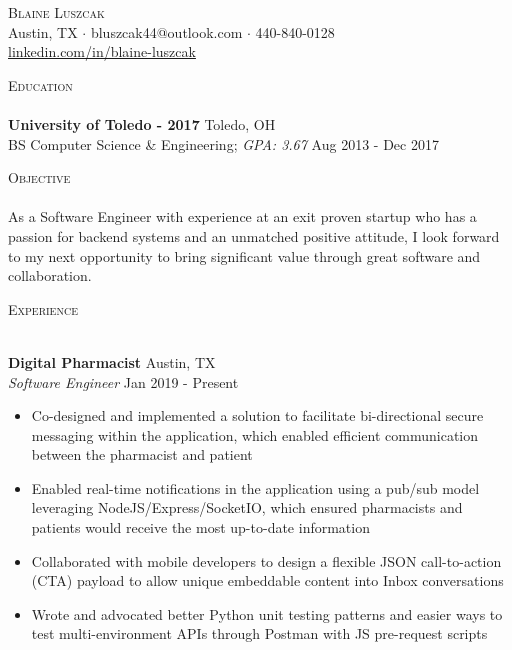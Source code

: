 \documentclass[a4paper]{article}
\newcommand{\lineunder} {
    \vspace*{-8pt} \\
    \hspace*{-18pt} \hrulefill \\
}
\newcommand{\header} [1] {
    {\hspace*{-18pt}\vspace*{6pt} \textsc{#1}}
    \vspace*{-6pt} \lineunder
}
\begin{document}
\vspace*{-40pt}

\vspace*{-10pt}
\begin{center}
    {\Huge \scshape {Blaine Luszcak}}\\
    Austin, TX $\cdot$ bluszcak44@outlook.com $\cdot$ 440-840-0128 \\
    \url{linkedin.com/in/blaine-luszcak}
\end{center}

\header{Education}
\textbf{University of Toledo - 2017} \hfill Toledo, OH \\
BS Computer Science \& Engineering; \textit{GPA: 3.67} \hfill Aug 2013 - Dec 2017 \\
\vspace{2mm}

\header{Objective}
As a Software Engineer with experience at an exit proven startup who has a passion for backend systems and an
unmatched positive attitude, I look forward to my next opportunity to bring significant value through great software and
collaboration.

\vspace{2mm}

\header{Experience}
\vspace{1mm}

\textbf{Digital Pharmacist} \hfill Austin, TX \\
\textit{Software Engineer} \hfill Jan 2019 - Present \\
\vspace{-3mm}
\begin{itemize} \itemsep -0.25mm
    \item Co-designed and implemented a solution to facilitate bi-directional secure messaging within the application,
    which enabled efficient communication between the pharmacist and patient
    \item Enabled real-time notifications in the application using a pub/sub model leveraging NodeJS/Express/SocketIO,
        which ensured pharmacists and patients would receive the most up-to-date information
    \item Collaborated with mobile developers to design a flexible JSON call-to-action (CTA) payload to allow unique
    embeddable content into Inbox conversations
    \item Wrote and advocated better Python unit testing patterns and easier ways to test multi-environment APIs through
    Postman with JS pre-request scripts
\end{itemize}
\vspace{-2mm}
\end{document}

